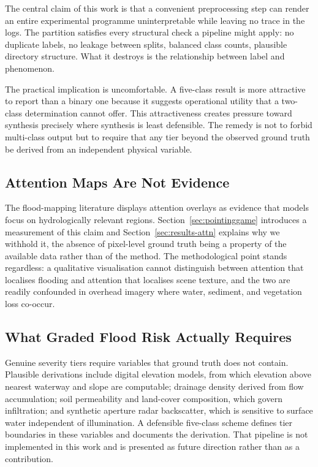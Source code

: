 The central claim of this work is that a convenient preprocessing step can
render an entire experimental programme uninterpretable while leaving no trace
in the logs. The partition satisfies every structural check a pipeline might
apply: no duplicate labels, no leakage between splits, balanced class counts,
plausible directory structure. What it destroys is the relationship between
label and phenomenon.

The practical implication is uncomfortable. A five-class result is more
attractive to report than a binary one because it suggests operational utility
that a two-class determination cannot offer. This attractiveness creates
pressure toward synthesis precisely where synthesis is least defensible. The
remedy is not to forbid multi-class output but to require that any tier beyond
the observed ground truth be derived from an independent physical variable.

\subsection{Attention Maps Are Not Evidence}

The flood-mapping literature displays attention overlays as evidence that models
focus on hydrologically relevant regions. Section~\ref{sec:pointinggame}
introduces a measurement of this claim and Section~\ref{sec:results-attn}
explains why we withhold it, the absence of pixel-level ground truth being a
property of the available data rather than of the method. The methodological
point stands regardless: a qualitative visualisation cannot distinguish between
attention that localises flooding and attention that localises scene texture,
and the two are readily confounded in overhead imagery where water, sediment,
and vegetation loss co-occur.

\subsection{What Graded Flood Risk Actually Requires}
\label{sec:graded}

Genuine severity tiers require variables that ground truth does not contain.
Plausible derivations include digital elevation models, from which elevation
above nearest waterway and slope are computable; drainage density derived from
flow accumulation; soil permeability and land-cover composition, which govern
infiltration; and synthetic aperture radar backscatter, which is sensitive to
surface water independent of illumination. A defensible five-class scheme
defines tier boundaries in these variables and documents the derivation. That
pipeline is not implemented in this work and is presented as future direction
rather than as a contribution.

